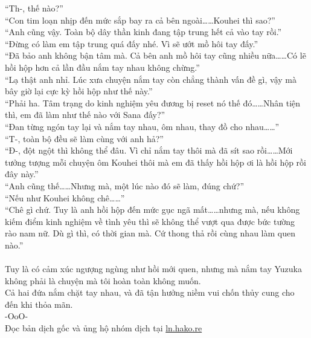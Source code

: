 \documentclass[12pt,a4paper, twosides]{book}
\begin{document}
“Th-, thế nào?”\\
“Con tim loạn nhịp đến mức sắp bay ra cả bên ngoài……Kouhei thì sao?”\\
“Anh cũng vậy. Toàn bộ dây thần kinh đang tập trung hết cả vào tay rồi.”\\
“Đừng có làm em tập trung quá đấy nhé. Vì sẽ ướt mồ hôi tay đấy.”\\
“Đã bảo anh không bận tâm mà. Cả bên anh mồ hôi tay cũng nhiều nữa……Có lẽ hồi hộp hơn cả lần đầu nắm tay nhau không chừng.”\\
“Lạ thật anh nhỉ. Lúc xưa chuyện nắm tay còn chẳng thành vấn đề gì, vậy mà bây giờ lại cực kỳ hồi hộp như thế này.”\\
“Phải ha. Tâm trạng do kinh nghiệm yêu đương bị reset nó thế đó……Nhân tiện thì, em đã làm như thế nào với Sana đấy?”\\
“Đan từng ngón tay lại và nắm tay nhau, ôm nhau, thay đồ cho nhau……”\\
“T-, toàn bộ đều sẽ làm cùng với anh hả?”\\
“Đ-, đột ngột thì không thể đâu. Vì chỉ nắm tay thôi mà đã sít sao rồi……Mới tưởng tượng mỗi chuyện ôm Kouhei thôi mà em đã thấy hồi hộp ơi là hồi hộp rồi đây này.”\\
“Anh cũng thế……Nhưng mà, một lúc nào đó sẽ làm, đúng chứ?”\\
“Nếu như Kouhei không chê……”\\
“Chê gì chứ. Tuy là anh hồi hộp đến mức gục ngã mất……nhưng mà, nếu không kiếm điểm kinh nghiệm về tình yêu thì sẽ không thể vượt qua được bức tường rào nam nữ. Dù gì thì, có thời gian mà. Cứ thong thả rồi cùng nhau làm quen nào.”\\
\\
Tuy là có cảm xúc ngượng ngùng như hồi mới quen, nhưng mà nắm tay Yuzuka không phải là chuyện mà tôi hoàn toàn không muốn.\\
Cả hai đứa nắm chặt tay nhau, và đã tận hưởng niềm vui chốn thủy cung cho đến khi thỏa mãn.\\
-OoO-\\
Đọc bản dịch gốc và ủng hộ nhóm dịch tại \href{https://ln.hako.re/}{ln.hako.re}\\
\newpage
\end{document}
